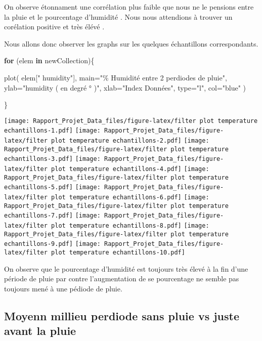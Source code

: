 \documentclass[
]{article}
\newenvironment{Shaded}{\begin{snugshade}}{\end{snugshade}}
\newcommand{\AttributeTok}[1]{\textcolor[rgb]{0.77,0.63,0.00}{#1}}
\newcommand{\ControlFlowTok}[1]{\textcolor[rgb]{0.13,0.29,0.53}{\textbf{#1}}}
\newcommand{\FunctionTok}[1]{\textcolor[rgb]{0.00,0.00,0.00}{#1}}
\newcommand{\NormalTok}[1]{#1}
\newcommand{\StringTok}[1]{\textcolor[rgb]{0.31,0.60,0.02}{#1}}
\begin{document}
On observe étonnament une corrélation plus faible que nous ne le
pensions entre la pluie et le pourcentage d'humidité . Nous nous
attendions à trouver un corélation positive et très élévé .

Nous allons donc observer les graphs sur les quelques échantillons
correspondants.

\begin{Shaded}
\begin{Highlighting}[]
\ControlFlowTok{for}\NormalTok{ (elem }\ControlFlowTok{in}\NormalTok{ newCollection)\{}
   

    \FunctionTok{plot}\NormalTok{( elem[}\StringTok{" humidity"}\NormalTok{], }\AttributeTok{main=}\StringTok{"\% Humidité entre 2 perdiodes de pluie"}\NormalTok{,}
          \AttributeTok{ylab=}\StringTok{"humidity ( en degré ° )"}\NormalTok{,}
          \AttributeTok{xlab=}\StringTok{"Index Données"}\NormalTok{,}
          \AttributeTok{type=}\StringTok{"l"}\NormalTok{,}
          \AttributeTok{col=}\StringTok{"blue"}\NormalTok{  )}

  
\NormalTok{\}}
\end{Highlighting}
\end{Shaded}

\texttt{[image: Rapport\_Projet\_Data\_files/figure-latex/filter plot temperature echantillons-1.pdf]}
\texttt{[image: Rapport\_Projet\_Data\_files/figure-latex/filter plot temperature echantillons-2.pdf]}
\texttt{[image: Rapport\_Projet\_Data\_files/figure-latex/filter plot temperature echantillons-3.pdf]}
\texttt{[image: Rapport\_Projet\_Data\_files/figure-latex/filter plot temperature echantillons-4.pdf]}
\texttt{[image: Rapport\_Projet\_Data\_files/figure-latex/filter plot temperature echantillons-5.pdf]}
\texttt{[image: Rapport\_Projet\_Data\_files/figure-latex/filter plot temperature echantillons-6.pdf]}
\texttt{[image: Rapport\_Projet\_Data\_files/figure-latex/filter plot temperature echantillons-7.pdf]}
\texttt{[image: Rapport\_Projet\_Data\_files/figure-latex/filter plot temperature echantillons-8.pdf]}
\texttt{[image: Rapport\_Projet\_Data\_files/figure-latex/filter plot temperature echantillons-9.pdf]}
\texttt{[image: Rapport\_Projet\_Data\_files/figure-latex/filter plot temperature echantillons-10.pdf]}

On observe que le pourcentage d'humidité est toujours très élevé à la
fin d'une période de pluie par contre l'augmentation de se pourcentage
ne semble pas toujours mené à une pédiode de pluie.

\hypertarget{moyenn-millieu-perdiode-sans-pluie-vs-juste-avant-la-pluie}{%
\subsection{Moyenn millieu perdiode sans pluie vs juste avant la
pluie}\label{moyenn-millieu-perdiode-sans-pluie-vs-juste-avant-la-pluie}}
\end{document}

